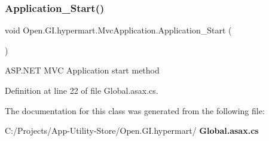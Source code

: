 \subsubsection{Application\+\_\+\+Start()}
{\footnotesize\ttfamily void Open.\+G\+I.\+hypermart.\+Mvc\+Application.\+Application\+\_\+\+Start (\begin{DoxyParamCaption}{ }\end{DoxyParamCaption})\hspace{0.3cm}{\ttfamily [protected]}}



A\+S\+P.\+N\+ET M\+VC Application start method 



Definition at line 22 of file Global.\+asax.\+cs.



The documentation for this class was generated from the following file\+:\begin{DoxyCompactItemize}
\item 
C\+:/\+Projects/\+App-\/\+Utility-\/\+Store/\+Open.\+G\+I.\+hypermart/\textbf{ Global.\+asax.\+cs}\end{DoxyCompactItemize}
